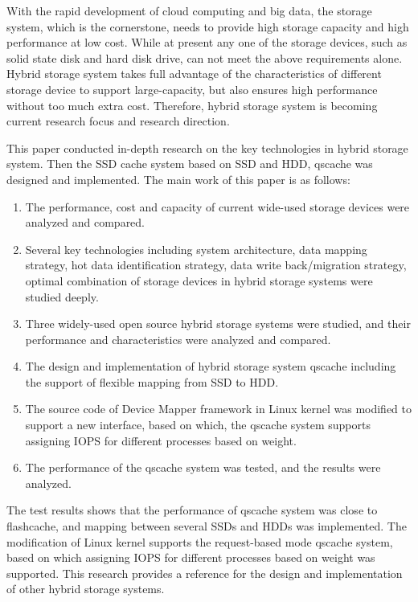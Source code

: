 \begin{englishabstract}

With the rapid development of cloud computing and big data, the storage system, which is the cornerstone, needs to provide high storage capacity and high performance at low cost. While at present any one of the storage devices, such as solid state disk and hard disk drive, can not meet the above requirements alone. Hybrid storage system takes full advantage of the characteristics of different storage device to support large-capacity, but also ensures high performance without too much extra cost. Therefore, hybrid storage system is becoming current research focus and research direction. 

This paper conducted in-depth research on the key technologies in hybrid storage system. Then the SSD cache system based on SSD and HDD, qscache was designed and implemented. The main work of this paper is as follows:


\begin{enumerate}[wide]
    \item The performance, cost and capacity of current wide-used storage devices were analyzed and compared.
    \item Several key technologies including system architecture, data mapping strategy, hot data identification strategy, data write back/migration strategy, optimal combination of storage devices in  hybrid storage systems were studied deeply.
    \item Three widely-used open source hybrid storage systems were studied, and their performance and characteristics were analyzed and compared.
    \item The design and implementation of hybrid storage system qscache including the support of flexible mapping from SSD to HDD.
    \item The source code of Device Mapper framework in Linux kernel was modified to support a new interface, based on which, the qscache system supports assigning IOPS for different processes based on weight.
    \item The performance of the qscache system was tested, and the results were analyzed.
\end{enumerate}

The test results shows that the performance of qscache system was close to flashcache, and mapping between several SSDs and HDDs was implemented. The modification of Linux kernel supports the request-based mode qscache system, based on which assigning IOPS for different processes based on weight was supported. This research provides a reference for the design and implementation of other hybrid storage systems.

\end{englishabstract}

